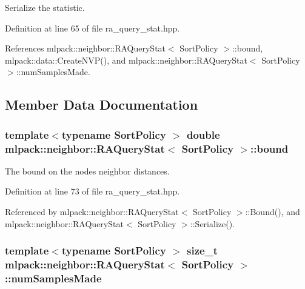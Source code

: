 Serialize the statistic. 



Definition at line 65 of file ra\+\_\+query\+\_\+stat.\+hpp.



References mlpack\+::neighbor\+::\+R\+A\+Query\+Stat$<$ Sort\+Policy $>$\+::bound, mlpack\+::data\+::\+Create\+N\+V\+P(), and mlpack\+::neighbor\+::\+R\+A\+Query\+Stat$<$ Sort\+Policy $>$\+::num\+Samples\+Made.



\subsection{Member Data Documentation}
\subsubsection[{bound}]{\setlength{\rightskip}{0pt plus 5cm}template$<$typename Sort\+Policy $>$ double {\bf mlpack\+::neighbor\+::\+R\+A\+Query\+Stat}$<$ Sort\+Policy $>$\+::bound\hspace{0.3cm}{\ttfamily [private]}}\label{classmlpack_1_1neighbor_1_1RAQueryStat_a702796c4b0dde428c875fae7a4241767}


The bound on the node\textquotesingle{}s neighbor distances. 



Definition at line 73 of file ra\+\_\+query\+\_\+stat.\+hpp.



Referenced by mlpack\+::neighbor\+::\+R\+A\+Query\+Stat$<$ Sort\+Policy $>$\+::\+Bound(), and mlpack\+::neighbor\+::\+R\+A\+Query\+Stat$<$ Sort\+Policy $>$\+::\+Serialize().

\subsubsection[{num\+Samples\+Made}]{\setlength{\rightskip}{0pt plus 5cm}template$<$typename Sort\+Policy $>$ size\+\_\+t {\bf mlpack\+::neighbor\+::\+R\+A\+Query\+Stat}$<$ Sort\+Policy $>$\+::num\+Samples\+Made\hspace{0.3cm}{\ttfamily [private]}}\label{classmlpack_1_1neighbor_1_1RAQueryStat_a3cd7914ee8302a753a0df4dc1869655b}


